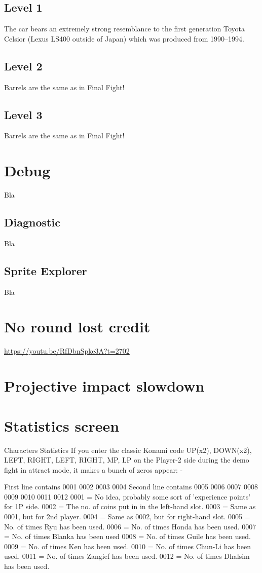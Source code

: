 \subsection{Level 1}
 The car bears an extremely strong resemblance to the first generation Toyota Celsior (Lexus LS400 outside of Japan) which was produced from 1990–1994.

\subsection{Level 2}
Barrels are the same as in Final Fight!
\subsection{Level 3}
Barrels are the same as in Final Fight!
\section{Debug}
Bla
\subsection{Diagnostic} Bla
\subsection{Sprite Explorer} Bla
\section{No round lost credit}
\url{https://youtu.be/RfDbnSpke3A?t=2702}
\section{Projective impact slowdown}
\section{Statistics screen}
Characters Statistics
If you enter the classic Konami code UP(x2), DOWN(x2), LEFT, RIGHT, LEFT, RIGHT, MP, LP on the Player-2 side during the demo fight in attract mode, it makes a bunch of zeros appear: -

First line contains 0001 0002 0003 0004
Second line contains 0005 0006 0007 0008 0009 0010 0011 0012
0001 = No idea, probably some sort of 'experience points' for 1P side.
0002 = The no. of coins put in in the left-hand slot.
0003 = Same as 0001, but for 2nd player.
0004 = Same as 0002, but for right-hand slot.
0005 = No. of times Ryu has been used.
0006 = No. of times Honda has been used.
0007 = No. of times Blanka has been used
0008 = No. of times Guile has been used.
0009 = No. of times Ken has been used.
0010 = No. of times Chun-Li has been used.
0011 = No. of times Zangief has been used.
0012 = No. of times Dhalsim has been used.